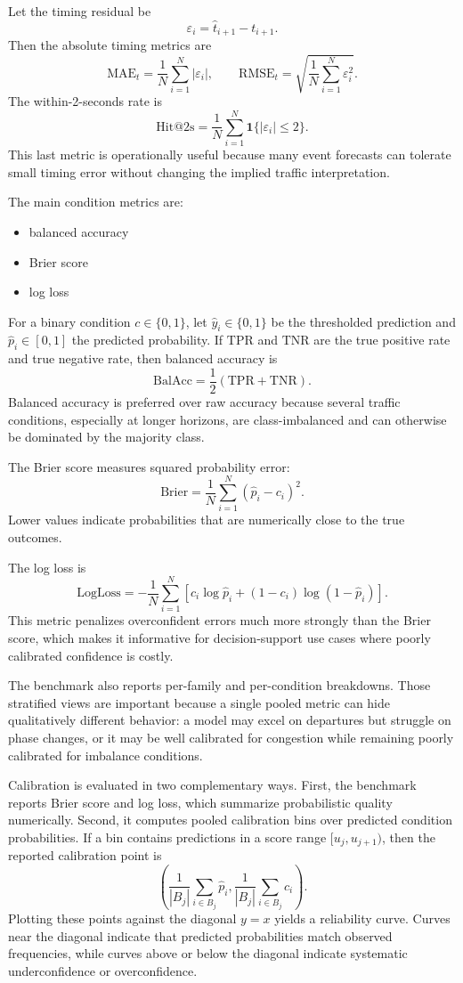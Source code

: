 \documentclass[11pt]{article}
\begin{document}
Let the timing residual be
\[
\varepsilon_i = \hat{t}_{i+1} - t_{i+1}.
\]
Then the absolute timing metrics are
\[
\mathrm{MAE}_{t} = \frac{1}{N}\sum_{i=1}^{N} |\varepsilon_i|,
\qquad
\mathrm{RMSE}_{t} =
\sqrt{\frac{1}{N}\sum_{i=1}^{N} \varepsilon_i^2 }.
\]
The within-2-seconds rate is
\[
\mathrm{Hit@2s} =
\frac{1}{N}\sum_{i=1}^{N}\mathbf{1}\{|\varepsilon_i|\le 2\}.
\]
This last metric is operationally useful because many event forecasts can tolerate small timing error without changing the implied traffic interpretation.

The main condition metrics are:
\begin{itemize}
  \item balanced accuracy
  \item Brier score
  \item log loss
\end{itemize}

For a binary condition \(c \in \{0,1\}\), let \(\hat{y}_i \in \{0,1\}\) be the thresholded prediction and \(\hat{p}_i \in [0,1]\) the predicted probability. If \(\mathrm{TPR}\) and \(\mathrm{TNR}\) are the true positive rate and true negative rate, then balanced accuracy is
\[
\mathrm{BalAcc} = \frac{1}{2}(\mathrm{TPR}+\mathrm{TNR}).
\]
Balanced accuracy is preferred over raw accuracy because several traffic conditions, especially at longer horizons, are class-imbalanced and can otherwise be dominated by the majority class.

The Brier score measures squared probability error:
\[
\mathrm{Brier} = \frac{1}{N}\sum_{i=1}^{N}(\hat{p}_i-c_i)^2.
\]
Lower values indicate probabilities that are numerically close to the true outcomes.

The log loss is
\[
\mathrm{LogLoss} =
-\frac{1}{N}\sum_{i=1}^{N}
\left[
c_i \log \hat{p}_i + (1-c_i)\log(1-\hat{p}_i)
\right].
\]
This metric penalizes overconfident errors much more strongly than the Brier score, which makes it informative for decision-support use cases where poorly calibrated confidence is costly.

The benchmark also reports per-family and per-condition breakdowns. Those stratified views are important because a single pooled metric can hide qualitatively different behavior: a model may excel on departures but struggle on phase changes, or it may be well calibrated for congestion while remaining poorly calibrated for imbalance conditions.

Calibration is evaluated in two complementary ways. First, the benchmark reports Brier score and log loss, which summarize probabilistic quality numerically. Second, it computes pooled calibration bins over predicted condition probabilities. If a bin contains predictions in a score range \([u_j, u_{j+1})\), then the reported calibration point is
\[
\left(
\frac{1}{|B_j|}\sum_{i \in B_j}\hat{p}_i,
\frac{1}{|B_j|}\sum_{i \in B_j} c_i
\right).
\]
Plotting these points against the diagonal \(y=x\) yields a reliability curve. Curves near the diagonal indicate that predicted probabilities match observed frequencies, while curves above or below the diagonal indicate systematic underconfidence or overconfidence.
\end{document}
